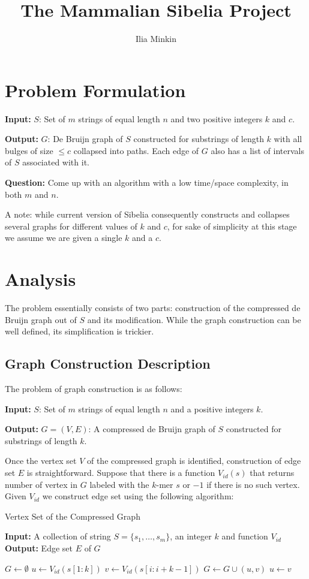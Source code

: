 \documentclass[a4paper, 12pt]{scrartcl}
\title{The Mammalian Sibelia Project}
\author{Ilia Minkin}
\date{}
\begin{document}
\maketitle
{}
\renewcommand{\algorithmicrequire}{\textbf{Input: }}
\renewcommand{\algorithmicensure}{\textbf{Output: }}

\section{Problem Formulation}
\textbf{Input:} $S$: Set of $m$ strings of equal length $n$ and two positive integers $k$ and $c$.

\textbf{Output:} $G$: De Bruijn graph of $S$ constructed for substrings of length $k$ with all bulges of size $\leq c$ collapsed into paths.
Each edge of $G$ also has a list of intervals of $S$ associated with it.

\textbf{Question:} Come up with an algorithm with a low time/space complexity, in both $m$ and $n$. 

A note: while current version of Sibelia consequently constructs and collapses several graphs for different values of $k$ and $c$, for sake of simplicity at this stage we assume we are given a single $k$ and a $c$.
\section{Analysis}
The problem essentially consists of two parts: construction of the compressed de Bruijn graph out of $S$ and its modification.
While the graph construction can be well defined, its simplification is trickier.
\subsection{Graph Construction Description}
The problem of graph construction is as follows:

\textbf{Input:} $S$: Set of $m$ strings of equal length $n$ and a positive integers $k$.

\textbf{Output:} $G = (V, E)$: A compressed de Bruijn graph of $S$ constructed for substrings of length $k$.

Once the vertex set $V$ of the compressed graph is identified, construction of edge set $E$ is straightforward.
Suppose that there is a function $V_{id}(s)$ that returns number of vertex in $G$ labeled with the $k$-mer $s$ or $-1$ if there is no such vertex.
Given $V_{id}$ we construct edge set using the following algorithm:
\begin{algorithm}[H]
\caption{Vertex Set of the Compressed Graph} 
\algorithmicrequire{A collection of string $S = \{s_1, \ldots, s_m\}$, an integer $k$ and function $V_{id}$} \\ 
\algorithmicensure{Edge set $E$ of $G$}
\begin{algorithmic}[1]
\State $G \gets \emptyset$
	\State $u \gets V_{id}(s[1:k])$
		\State $v \gets V_{id}(s[i:i + k - 1])$
			\State $G \gets G \cup (u, v)$
			\State $u \gets v$
		\EndIf
	\EndFor
\EndFor
\end{algorithmic}
\end{algorithm}
\end{document}
